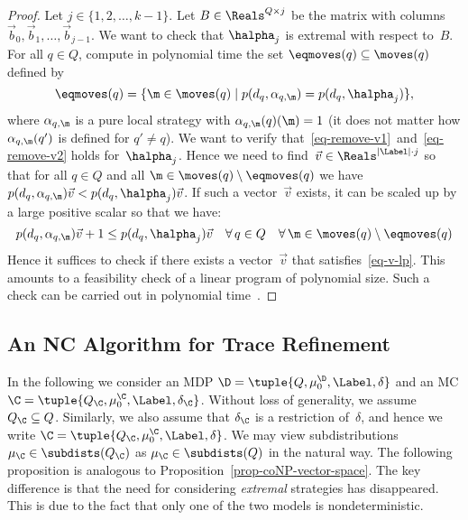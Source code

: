 \begin{proof}
Let $j \in \{1, 2, \ldots, k-1\}$.
Let $B \in \Reals^{Q \times j}$ be the matrix with columns $\vec{b}_0, \vec{b}_1, \ldots, \vec{b}_{j-1}$.
We want to check that $\halpha_j$ is extremal with respect to~$B$.
For all $q \in Q$, compute in polynomial time the set $\eqmoves(q) \subseteq \moves(q)$ defined by
\[
\eqmoves(q) = \{ \m \in \moves(q) \mid p(d_q, \alpha_{q,\m}) = p(d_q, \halpha_j) \},
\]
where $\alpha_{q,\m}$ is a pure local strategy with $\alpha_{q,\m}(q)(\m) = 1$ (it does not matter how $\alpha_{q,\m}(q')$ is defined for $q' \ne q$).
We want to verify that~\eqref{eq-remove-v1}~and~\eqref{eq-remove-v2} holds for~$\halpha_j$.
Hence we need to find~$\vec{v} \in \Reals^{|\Label| \cdot j}$ so that for all $q \in Q$ and all $\m \in \moves(q) \setminus \eqmoves(q)$ we have $p(d_q, \alpha_{q,\m}) \vec{v} < p(d_q, \halpha_j) \vec{v}$.
If such a vector~$\vec{v}$ exists, it can be scaled up by a large positive scalar so that we have:
\begin{equation} \label{eq-v-lp}
 p(d_q, \alpha_{q,\m}) \vec{v} + 1 \le p(d_q, \halpha_j) \vec{v} \quad \forall\, q \in Q \quad \forall\, \m \in \moves(q) \setminus \eqmoves(q)
\end{equation}
Hence it suffices to check if there exists a vector~$\vec{v}$ that satisfies~\eqref{eq-v-lp}.
This amounts to a feasibility check of a linear program of polynomial size.
Such a check can be carried out in polynomial time~\cite{Khachiyan79}.
\end{proof}

\subsection{An NC Algorithm for Trace Refinement}\label{subsec:algo_nc_trace_refinement}

In the following we consider an MDP $\D = \tuple{Q,\mu^{\D}_{0},\Label,\delta}$ and an MC $\C = \tuple{Q_\C,\mu^{\C}_{0},\Label,\delta_\C}$.
Without loss of generality, we assume $Q_\C \subseteq Q$.
Similarly, we also assume that $\delta_\C$ is a restriction of~$\delta$, and hence we write $\C = \tuple{Q_\C,\mu^{\C}_{0},\Label,\delta}$.
We may view subdistributions $\mu_\C \in \subdists(Q_\C)$ as $\mu_\C \in \subdists(Q)$ in the natural way.
The following proposition is analogous to Proposition~\ref{prop-coNP-vector-space}.
The key difference is that the need for considering \emph{extremal} strategies has disappeared.
This is due to the fact that only one of the two models is nondeterministic.

